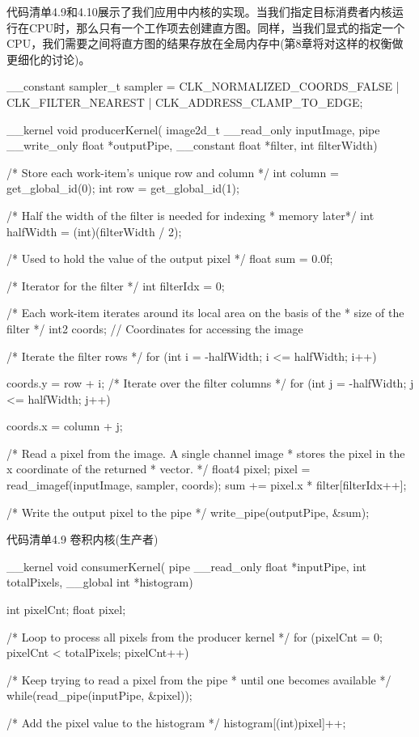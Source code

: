 代码清单4.9和4.10展示了我们应用中内核的实现。当我们指定目标消费者内核运行在CPU时，那么只有一个工作项去创建直方图。同样，当我们显式的指定一个CPU，我们需要之间将直方图的结果存放在全局内存中(第8章将对这样的权衡做更细化的讨论)。

\begin{codebox}[cpp]
__constant sampler_t sampler =
  CLK_NORMALIZED_COORDS_FALSE |
  CLK_FILTER_NEAREST          |
  CLK_ADDRESS_CLAMP_TO_EDGE;

__kernel
void producerKernel(
  image2d_t __read_only inputImage,
  pipe __write_only float *outputPipe,
  __constant float *filter,
  int filterWidth)
{
  /* Store each work-item's unique row and column */
  int column = get_global_id(0);
  int row = get_global_id(1);

  /* Half the width of the filter is needed for indexing
   * memory later*/
  int halfWidth = (int)(filterWidth / 2);

  /* Used to hold the value of the output pixel */
  float sum = 0.0f;

  /* Iterator for the filter */
  int filterIdx = 0;

  /* Each work-item iterates around its local area on the basis of the
   * size of the filter */
  int2 coords; // Coordinates for accessing the image

  /* Iterate the filter rows */
  for (int i = -halfWidth; i <= halfWidth; i++)
  {
    coords.y = row + i;
    /* Iterate over the filter columns */
    for (int j = -halfWidth; j <= halfWidth; j++)
    {
      coords.x = column + j;

      /* Read a pixel from the image. A single channel image
       * stores the pixel in the x coordinate of the returned
       * vector. */
      float4 pixel;
      pixel = read_imagef(inputImage, sampler, coords);
      sum += pixel.x * filter[filterIdx++];
    }
  }

  /* Write the output pixel to the pipe */
  write_pipe(outputPipe, &sum);
}
\end{codebox}

代码清单4.9 卷积内核(生产者)

\begin{codebox}[cpp]
__kernel
void consumerKernel(
  pipe __read_only float *inputPipe,
  int totalPixels,
  __global int *histogram)
{
  int pixelCnt;
  float pixel;

  /* Loop to process all pixels from the producer kernel */
  for (pixelCnt = 0; pixelCnt < totalPixels; pixelCnt++)
  {
    /* Keep trying to read a pixel from the pipe
     * until one becomes available */
    while(read_pipe(inputPipe, &pixel));

    /* Add the pixel value to the histogram */
    histogram[(int)pixel]++;
  }
}
\end{codebox}

